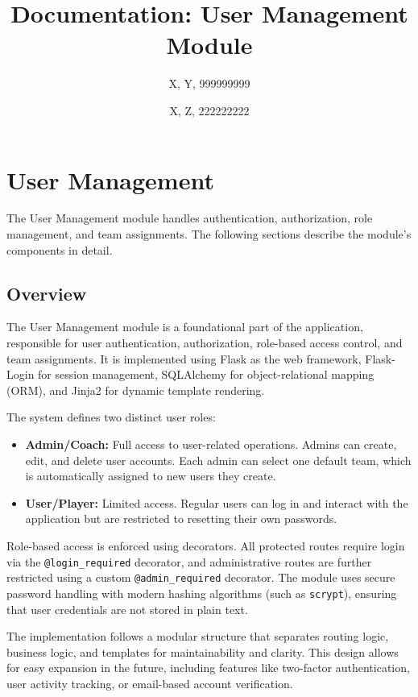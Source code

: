 \documentclass[12pt]{article}
\title{Documentation: User Management Module}
\author{X, Y, 999999999\\ \and X, Z, 222222222}
\date{}
\begin{document}
\maketitle
\tableofcontents
\newpage

\section{User Management}


The User Management module handles authentication, authorization, role management, and team assignments. The following sections describe the module's components in detail.

\subsection{Overview}

The User Management module is a foundational part of the application, responsible for user authentication, authorization, role-based access control, and team assignments. It is implemented using Flask as the web framework, Flask-Login for session management, SQLAlchemy for object-relational mapping (ORM), and Jinja2 for dynamic template rendering.

The system defines two distinct user roles:
\begin{itemize}
  \item \textbf{Admin/Coach:} Full access to user-related operations. Admins can create, edit, and delete user accounts. Each admin can select one default team, which is automatically assigned to new users they create.
  \item \textbf{User/Player:} Limited access. Regular users can log in and interact with the application but are restricted to resetting their own passwords.
\end{itemize}
\noindent Role-based access is enforced using decorators. All protected routes require login via the \texttt{@login\_required} decorator, and administrative routes are further restricted using a custom \texttt{@admin\_required} decorator. The module uses secure password handling with modern hashing algorithms (such as \texttt{scrypt}), ensuring that user credentials are not stored in plain text.

\noindent The implementation follows a modular structure that separates routing logic, business logic, and templates for maintainability and clarity. This design allows for easy expansion in the future, including features like two-factor authentication, user activity tracking, or email-based account verification.
\end{document}
